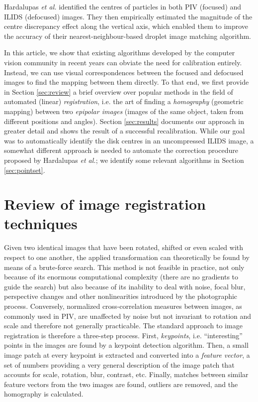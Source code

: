 \documentclass[floatfix,aip,rsi,reprint,graphicx]{revtex4-1}
\begin{document}
Hardalupas \emph{et al.} identified the centres of particles in both PIV
(focused) and ILIDS (defocused) images. They then empirically estimated the
magnitude of the centre discrepancy effect along the vertical axis, which
enabled them to improve the accuracy of their nearest-neighbour-based droplet
image matching algorithm.

In this article, we show that existing algorithms developed by the computer
vision community in recent years can obviate the need for calibration entirely.
Instead, we can use visual correspondences between the focused and defocused
images to find the mapping between them directly. To that end, we first provide
in Section \ref{sec:review} a brief overview over popular methods in the field of automated (linear)
\emph{registration}, i.e. the art of finding a \emph{homography} (geometric
mapping) between two \emph{epipolar images} (images of the same object, taken
from different positions and angles). Section \ref{sec:results} documents 
our approach in greater detail and shows the result of a successful
recalibration. While our goal was to automatically identify the disk centres in
an uncompressed ILIDS image, a somewhat different approach is needed to automate the
correction procedure proposed by Hardalupas \emph{et al.}; we identify some
relevant algorithms in Section \ref{sec:pointset}.

\section{Review of image registration techniques \label{sec:review}} Given two
identical images that have been rotated, shifted or even scaled with respect to
one another, the applied transformation can theoretically be found by means of a
brute-force search. This method is not feasible in practice, not only because of
its enormous computational complexity (there are no gradients to guide the
search) but also because of its inability to deal with noise, focal blur,
perspective changes and other nonlinearities introduced by the photographic
process. Conversely, normalized cross-correlation measures between images, as
commonly used in PIV, are unaffected by noise but not invariant to rotation and
scale and therefore not generally practicable. The standard approach to image
registration is therefore a three-step process. First, \emph{keypoints}, i.e.
``interesting'' points in the images are found by a keypoint detection
algorithm.  Then, a small image patch at every keypoint is extracted and
converted into a \emph{feature vector}, a set of numbers providing a very
general description of the image patch that accounts for scale, rotation, blur,
contrast, etc. Finally, matches between similar feature vectors from the two
images are found, outliers are removed, and the homography is calculated.
\end{document}
